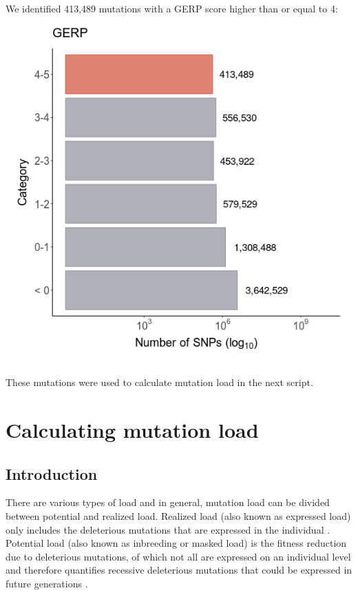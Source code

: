 \documentclass[
  letterpaper,
  DIV=11,
  numbers=noendperiod]{scrreprt}
\begin{document}
We identified 413,489 mutations with a GERP score higher than or equal
to 4: \includegraphics{qmd/../plots/main/fig_1a.png}

These mutations were used to calculate mutation load in the next script.


\hypertarget{calculating-mutation-load}{%
\chapter{Calculating mutation load}\label{calculating-mutation-load}}

\hypertarget{introduction-3}{%
\section{Introduction}\label{introduction-3}}

There are various types of load and in general, mutation load can be
divided between potential and realized load. Realized load (also known
as expressed load) only includes the deleterious mutations that are
expressed in the individual \autocite{bertorelleGeneticLoadGenomic2022}.
Potential load (also known as inbreeding or masked load) is the fitness
reduction due to deleterious mutations, of which not all are expressed
on an individual level and therefore quantifies recessive deleterious
mutations that could be expressed in future generations
\autocite{bertorelleGeneticLoadGenomic2022}.
\end{document}
